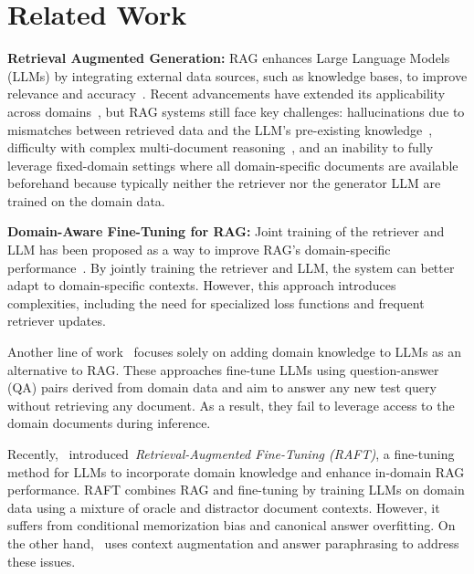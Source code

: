 \section{Related Work}
\label{sec:related}

\noindent\textbf{Retrieval Augmented Generation:} RAG enhances Large Language Models (LLMs) by integrating external data sources, such as knowledge bases, to improve relevance and accuracy~\citep{lewis2020retrieval, guu2020retrieval, karpukhin2020dense}. Recent advancements have extended its applicability across domains~\citep{asai2024self, kimsure, yan2024corrective, liu-etal-2024-ra}, but RAG systems still face key challenges: hallucinations due to mismatches between retrieved data and the LLM’s pre-existing knowledge~\citep{setty2024improvingretrievalragbased, jin2024tug}, difficulty with complex multi-document reasoning~\citep{setty2024improvingretrievalragbased}, and an inability to fully leverage fixed-domain settings where all domain-specific documents are available beforehand because typically neither the retriever nor the generator LLM are trained on the domain data.

\noindent\textbf{Domain-Aware Fine-Tuning for RAG:} Joint training of the retriever and LLM has been proposed as a way to improve RAG’s domain-specific performance~\citep{guu2020retrieval, singh2021end, siriwardhana-etal-2023-improving, shi2024replug}. By jointly training the retriever and LLM, the system can better adapt to domain-specific contexts. However, this approach introduces complexities, including the need for specialized loss functions and frequent retriever updates. 

Another line of work~\citep{mecklenburg2024injecting, zhang2024self} focuses solely on adding domain knowledge to LLMs as an alternative to RAG.
These approaches fine-tune LLMs using question-answer (QA) pairs derived from domain data and aim to answer any new test query without retrieving any document. As a result, they fail to leverage access to the domain documents during inference.

Recently,~\citeauthor{zhang2024raft} introduced~\textit{Retrieval-Augmented Fine-Tuning (RAFT)}, a fine-tuning method for LLMs to incorporate domain knowledge and enhance in-domain RAG performance. 
RAFT combines RAG and fine-tuning by training LLMs on domain data using a mixture of oracle and distractor document contexts.
However, it suffers from conditional memorization bias and canonical answer overfitting. 
On the other hand, \ourmethodshort\ uses context augmentation and answer paraphrasing to address these issues.

